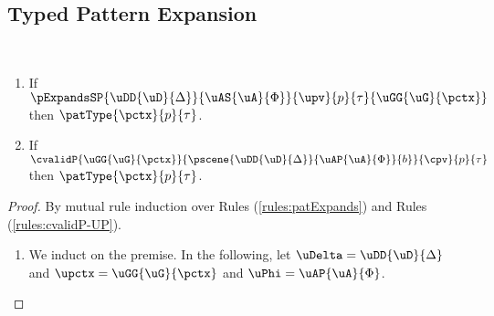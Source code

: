 \vspace{15px}
\begin{grayparbox}\vspace{-15px}
\subsection{Typed Pattern Expansion}\label{appendix:SES-typed-pattern-expansion}
\begin{theorem}\label{thm:typed-pattern-expansion} ~
\begin{enumerate}
  \item If $\pExpandsSP{\uDD{\uD}{\Delta}}{\uAS{\uA}{\Phi}}{\upv}{p}{\tau}{\uGG{\uG}{\pctx}}$ then $\patType{\pctx}{p}{\tau}$.
  \item If $\cvalidP{\uGG{\uG}{\pctx}}{\pscene{\uDD{\uD}{\Delta}}{\uAP{\uA}{\Phi}}{b}}{\cpv}{p}{\tau}$ then $\patType{\pctx}{p}{\tau}$.
\end{enumerate}
\end{theorem}
\begin{proof}
  By mutual rule induction over Rules (\ref{rules:patExpands}) and Rules (\ref{rules:cvalidP-UP}).
  \begin{enumerate}
  \item We induct on the premise. In the following, let $\uDelta=\uDD{\uD}{\Delta}$ and $\upctx=\uGG{\uG}{\pctx}$ and $\uPhi=\uAP{\uA}{\Phi}$.
\end{enumerate}
\end{proof}
\end{grayparbox}
